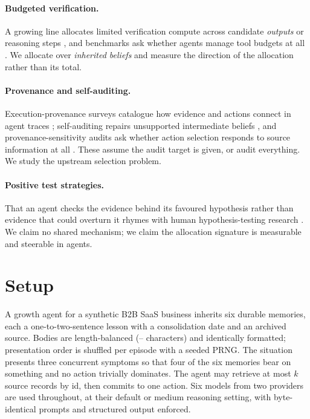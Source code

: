 \documentclass{article}
\begin{document}
\paragraph{Budgeted verification.} A growing line allocates limited verification
compute across candidate \emph{outputs} or reasoning steps
\citep{yuan2026belief,fang2026budget,yang2026hetero}, and benchmarks ask whether
agents manage tool budgets at all \citep{wang2026allocbench,lin2026bagen}. We allocate over \emph{inherited
beliefs} and measure the direction of the allocation rather than its total.

\paragraph{Provenance and self-auditing.} Execution-provenance surveys catalogue
how evidence and actions connect in agent traces \citep{wang2026traces};
self-auditing repairs unsupported intermediate beliefs \citep{yuan2026verify},
and provenance-sensitivity audits ask whether action selection responds to
source information at all \citep{liao2026auditing}. These assume the audit target is given, or
audit everything. We study the upstream selection problem.

\paragraph{Positive test strategies.} That an agent checks the evidence behind
its favoured hypothesis rather than evidence that could overturn it rhymes with
human hypothesis-testing research \citep{wason1960,klayman1987}. We claim no shared mechanism; we claim the
allocation signature is measurable and steerable in agents.

\section{Setup}\label{sec:setup}

A growth agent for a synthetic B2B SaaS business inherits six durable memories,
each a one-to-two-sentence lesson with a consolidation date and an archived
source. Bodies are length-balanced (\BodyMin--\BodyMax{} characters) and identically
formatted; presentation order is shuffled per episode with a seeded PRNG. The
situation presents three concurrent symptoms so that four of the six memories
bear on something and no action trivially dominates. The agent may retrieve at
most $k$ source records by id, then commits to one action. Six models from two
providers are used throughout, at their default or medium reasoning setting,
with byte-identical prompts and structured output enforced.
\end{document}
